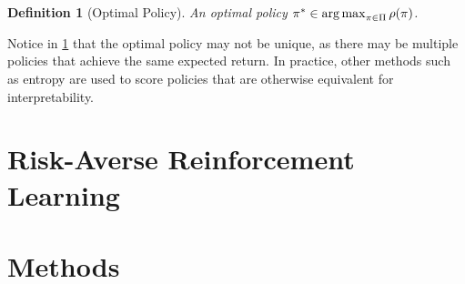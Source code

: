 \documentclass[10pt]{article}
\newtheorem{definition}{Definition}
\theoremstyle{plain}
\theoremstyle{remark}
\begin{document}
\begin{definition}[Optimal Policy]
        \label{def:optimal_policy}
        An optimal policy $\pi^* \in \operatorname*{arg\,max}_{\pi \in \Pi} \rho(\pi)$.
\end{definition}

Notice in \ref{def:optimal_policy} that the optimal policy may not be unique, 
as there may be multiple policies that achieve the same expected return. 
In practice, other methods such as entropy are used to score policies that are otherwise equivalent for interpretability.


\section{Risk-Averse Reinforcement Learning}

\section{Methods}


\end{document}
